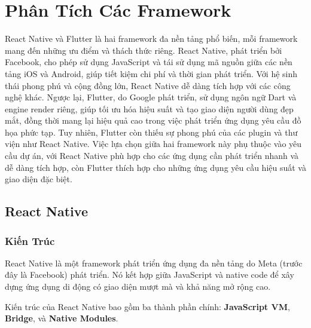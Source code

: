 \section{Phân Tích Các Framework}

  React Native và Flutter là hai framework đa nền tảng phổ biến, mỗi framework mang đến những ưu điểm và thách thức riêng. React Native, phát triển bởi Facebook, cho phép sử dụng JavaScript và tái sử dụng mã nguồn giữa các nền tảng iOS và Android, giúp tiết kiệm chi phí và thời gian phát triển. Với hệ sinh thái phong phú và cộng đồng lớn, React Native dễ dàng tích hợp với các công nghệ khác. Ngược lại, Flutter, do Google phát triển, sử dụng ngôn ngữ Dart và engine render riêng, giúp tối ưu hóa hiệu suất và tạo giao diện người dùng đẹp mắt, đồng thời mang lại hiệu quả cao trong việc phát triển ứng dụng yêu cầu đồ họa phức tạp. Tuy nhiên, Flutter còn thiếu sự phong phú của các plugin và thư viện như React Native. Việc lựa chọn giữa hai framework này phụ thuộc vào yêu cầu dự án, với React Native phù hợp cho các ứng dụng cần phát triển nhanh và dễ dàng tích hợp, còn Flutter thích hợp cho những ứng dụng yêu cầu hiệu suất và giao diện đặc biệt.

\subsection{React Native}
\renewcommand{\labelitemi}{--}    
\subsubsection{Kiến Trúc}

\begin{sloppypar}
React Native là một framework phát triển ứng dụng đa nền tảng do Meta (trước đây là Facebook) phát triển. Nó kết hợp giữa JavaScript và native code để xây dựng ứng dụng di động có giao diện mượt mà và khả năng mở rộng cao.
\end{sloppypar}

\vspace{0.5em}

\begin{sloppypar}
Kiến trúc của React Native bao gồm ba thành phần chính: \textbf{JavaScript VM}, \textbf{Bridge}, và \textbf{Native Modules}.
\end{sloppypar}

\vspace{0.5em}

